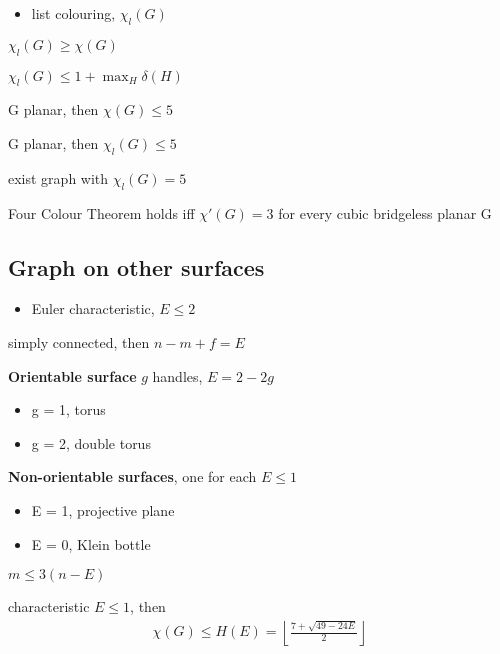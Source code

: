 \begin{itemize}
    \item list colouring, $\chi_l(G)$
\end{itemize}

\begin{fact}
    $\chi_l(G) \geq \chi(G)$
\end{fact}

\begin{fact}
    $\chi_l(G) \leq 1 + \max_H\delta(H)$
\end{fact}

\begin{thm}
    G planar, then $\chi(G) \leq 5$
\end{thm}

\begin{thm}[Thomasson]
    G planar, then $\chi_l(G) \leq 5$
\end{thm}

\begin{fact}
    exist graph with $\chi_l(G) = 5$
\end{fact}

\begin{thm}[Tait]
    Four Colour Theorem holds iff $\chi'(G) = 3$ for every cubic bridgeless planar G
\end{thm}

\subsection{Graph on other surfaces}\label{subsec:graph-on-other-surfaces}

\begin{itemize}
    \item Euler characteristic, $E \leq 2$
\end{itemize}

\begin{fact}
    simply connected, then $n - m + f = E$
\end{fact}

\begin{example}
    \textbf{Orientable surface} $g$ handles, $E = 2 - 2g$
    \begin{itemize}
        \item g = 1, torus
        \item g = 2, double torus
    \end{itemize}
    \textbf{Non-orientable surfaces}, one for each $E \leq 1$
    \begin{itemize}
        \item E = 1, projective plane
        \item E = 0, Klein bottle
    \end{itemize}
\end{example}

\begin{fact}
    $m \leq 3(n - E)$
\end{fact}

\begin{thm}[Heawood]
characteristic $E \leq 1$, then
    \begin{align*}
        \chi(G) \leq H(E) = \left \lfloor \frac{7 + \sqrt{49 - 24E}}{2} \right \rfloor
    \end{align*}
\end{thm}